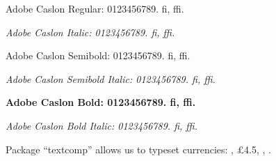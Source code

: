 \documentclass{article}
\begin{document}
Adobe Caslon Regular: 0123456789. fi, ffi. \lipsum[1]

{\itshape Adobe Caslon Italic: 0123456789. fi, ffi. \lipsum[2]}


{\sbseries
Adobe Caslon Semibold: 0123456789. fi, ffi. \lipsum[3]

\itshape Adobe Caslon Semibold Italic: 0123456789. fi, ffi. \lipsum[4]}


{\bfseries
Adobe Caslon Bold: 0123456789. fi, ffi. \lipsum[5]

\itshape Adobe Caslon Bold Italic: 0123456789. fi, ffi. \lipsum[6]}


Package ``textcomp'' allows us to typeset currencies: ,
\pounds4.5, , .
\end{document}

